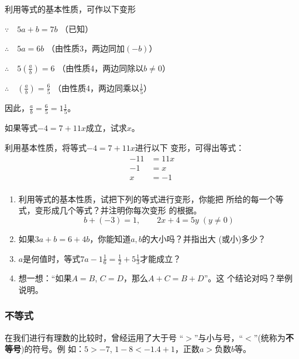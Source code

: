\begin{solution}
	利用等式的基本性质，可作以下变形
	
	$\because\quad 5a+b=7b$ （已知）
	
	$\therefore\quad 5a=6b$ （由性质3，两边同加$(-b)$）
	
	$\therefore\quad 5\left(\frac{a}{b}\right)=6$ （由性质4，两边同除以$b\ne 0$）
	
	$\therefore\quad \left(\frac{a}{b}\right)=\frac{6}{5}$ （由性质4，两边同乘以$\frac{1}{5}$）
	
	因此，$\frac{a}{b}=\frac{6}{5}=1\frac{1}{5}$。
\end{solution}

\begin{example}
	如果等式$-4=7+11x$成立，试求$x$。
\end{example}

\begin{solution}
	利用基本性质，将等式$-4=7+11x$进行以下
	变形，可得出等式：
	\begin{align*}
	-11&=11x  \tag{两边同减去7}\\
	-1&=x  \tag{两边同除以11}\\
	x&=-1  \tag{两边对调位置}\\
	\end{align*}
\end{solution}

\begin{ex}
	\begin{enumerate}
		\item 利用等式的基本性质，试把下列的等式进行变形，你能把
		所给的每一个等式，变形成几个等式？并注明你每次变形
		的根据。
		\[b+(-3)=1,\qquad 2x+4=5y\; (y\ne 0) \]
		\item 如果$3a+b=6+4b$，你能知道$a,b$的大小吗？并指出大
		(或小)多少？
		\item $a$是何值时，等式$7a-1\frac{1}{6}=\frac{1}{2}+5\frac{1}{3}$才能成立？
		
		\item 想一想：“如果$A=B$, $C=D$，那么$A+C=B+D$”。这
		个结论对吗？举例说明。
	\end{enumerate}   
\end{ex}

\subsubsection{不等式}
在我们进行有理数的比较时，曾经运用了大于号
“$>$”与小与号，“$<$”(统称为\textbf{不等号})的符号。例
如：$5>-7$,  $1-8<-1.4+1$，正数$a>$负数$b$等。


